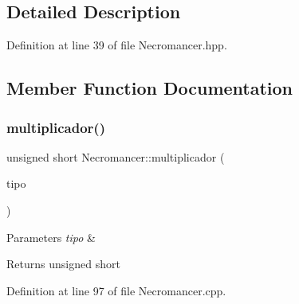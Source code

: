 \subsection{Detailed Description}


Definition at line 39 of file Necromancer.\+hpp.



\subsection{Member Function Documentation}
\mbox{\label{class_necromancer_ae276261d4338078bb09b24e73c1abb5b}} 
\subsubsection{\texorpdfstring{multiplicador()}{multiplicador()}\hspace{0.1cm}{\footnotesize\ttfamily [1/2]}}
{\footnotesize\ttfamily unsigned short Necromancer\+::multiplicador (\begin{DoxyParamCaption}\item[{Tipo\+Pilar}]{tipo }\end{DoxyParamCaption})}


\begin{DoxyParams}{Parameters}
{\em tipo} & \\
\hline
\end{DoxyParams}
\begin{DoxyReturn}{Returns}
unsigned short 
\end{DoxyReturn}


Definition at line 97 of file Necromancer.\+cpp.


